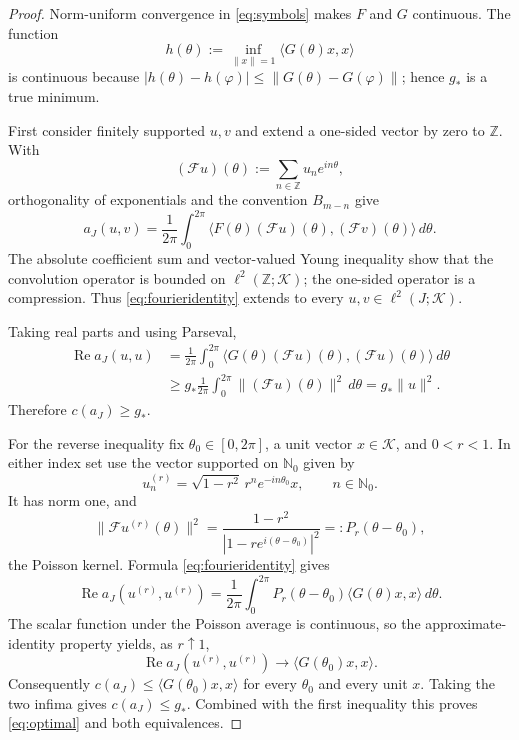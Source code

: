 \documentclass[11pt]{article}
\theoremstyle{definition}
\newcommand{\N}{\mathbb N_0}
\newcommand{\K}{\mathcal K}
\newcommand{\Real}{\operatorname{Re}}
\begin{document}
\begin{proof}
Norm-uniform convergence in \eqref{eq:symbols} makes $F$ and $G$ continuous.
The function
\[
 h(\theta):=\inf_{\|x\|=1}\langle G(\theta)x,x\rangle
\]
is continuous because
$|h(\theta)-h(\varphi)|\le\|G(\theta)-G(\varphi)\|$; hence $g_*$ is a true
minimum.

First consider finitely supported $u,v$ and extend a one-sided vector by zero
to $\mathbb Z$.  With
\[
 (\mathcal Fu)(\theta):=\sum_{n\in\mathbb Z}u_ne^{in\theta},
\]
orthogonality of exponentials and the convention $B_{m-n}$ give
\begin{equation}\label{eq:fourieridentity}
 a_J(u,v)=\frac1{2\pi}\int_0^{2\pi}
 \langle F(\theta)(\mathcal Fu)(\theta),
                (\mathcal Fv)(\theta)\rangle\,d\theta.
\end{equation}
The absolute coefficient sum and vector-valued Young inequality show that the
convolution operator is bounded on $\ell^2(\mathbb Z;\K)$; the one-sided
operator is a compression.  Thus \eqref{eq:fourieridentity} extends to every
$u,v\in\ell^2(J;\K)$.

Taking real parts and using Parseval,
\begin{align*}
 \Real a_J(u,u)
 &=\frac1{2\pi}\int_0^{2\pi}
   \langle G(\theta)(\mathcal Fu)(\theta),
                  (\mathcal Fu)(\theta)\rangle\,d\theta\\
 &\ge g_*\frac1{2\pi}\int_0^{2\pi}
                  \|(\mathcal Fu)(\theta)\|^2\,d\theta
 =g_*\|u\|^2.
\end{align*}
Therefore $c(a_J)\ge g_*$.

For the reverse inequality fix $\theta_0\in[0,2\pi]$, a unit vector
$x\in\K$, and $0<r<1$.  In either index set use the vector supported on
$\N$ given by
\[
 u_n^{(r)}=\sqrt{1-r^2}\,r^n e^{-in\theta_0}x,
 \qquad n\in\N.
\]
It has norm one, and
\[
 \|\mathcal Fu^{(r)}(\theta)\|^2
 =\frac{1-r^2}{|1-re^{i(\theta-\theta_0)}|^2}
 =:P_r(\theta-\theta_0),
\]
the Poisson kernel.  Formula \eqref{eq:fourieridentity} gives
\[
 \Real a_J(u^{(r)},u^{(r)})
 =\frac1{2\pi}\int_0^{2\pi}P_r(\theta-\theta_0)
       \langle G(\theta)x,x\rangle\,d\theta.
\]
The scalar function under the Poisson average is continuous, so the
approximate-identity property yields, as $r\uparrow1$,
\[
 \Real a_J(u^{(r)},u^{(r)})
 \longrightarrow\langle G(\theta_0)x,x\rangle.
\]
Consequently
$c(a_J)\le\langle G(\theta_0)x,x\rangle$ for every $\theta_0$ and every unit
$x$.  Taking the two infima gives $c(a_J)\le g_*$.  Combined with the first
inequality this proves \eqref{eq:optimal} and both equivalences.
\end{proof}
\end{document}
